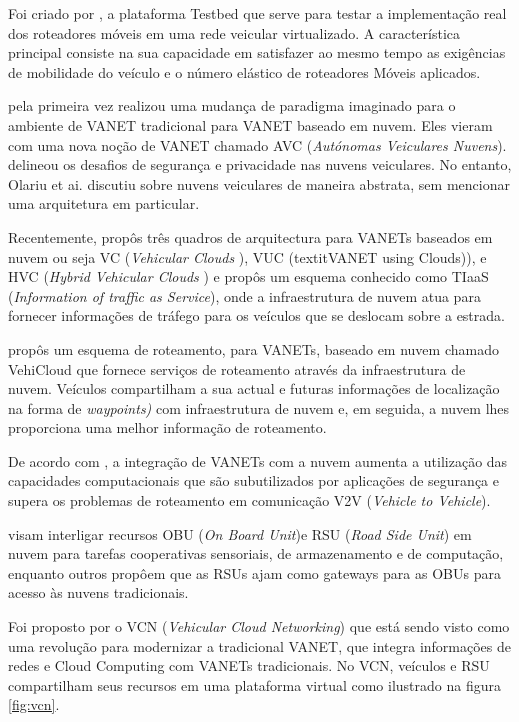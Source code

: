 \documentclass[
	12pt,				%
	oneside,			%
	a4paper,			%
	english,			%
	brazil				%
	]{abntex2ppgsi}
\begin{document}
Foi criado por  , a plataforma Testbed que serve para testar a implementação real dos roteadores móveis em uma rede veicular virtualizado. A característica principal consiste na sua capacidade em satisfazer ao mesmo tempo as exigências de mobilidade do veículo e o número elástico de roteadores Móveis aplicados.

 pela primeira vez realizou uma mudança de paradigma imaginado para o ambiente de VANET tradicional para VANET baseado em nuvem. Eles vieram com uma nova noção de VANET chamado AVC (\textit{Autónomas Veiculares Nuvens}).   delineou os desafios de segurança e privacidade nas nuvens veiculares. No entanto, Olariu et ai. discutiu sobre nuvens veiculares de maneira abstrata, sem mencionar uma arquitetura em  particular. 

Recentemente,  propôs três quadros de arquitectura para VANETs baseados em nuvem ou seja VC (\textit{Vehicular Clouds }), VUC (textit{VANET using Clouds)}), e HVC (\textit{Hybrid Vehicular Clouds }) e propôs um esquema conhecido como TIaaS (\textit{Information of traffic as Service}), onde a infraestrutura de nuvem atua para fornecer informações de tráfego para os veículos que se deslocam sobre a estrada.

  propôs um esquema de roteamento, para VANETs, baseado em nuvem chamado VehiCloud que fornece serviços de roteamento através da infraestrutura de nuvem. Veículos compartilham a sua actual e futuras informações de localização na forma de \textit{waypoints)} com infraestrutura de nuvem e, em seguida, a nuvem lhes proporciona uma melhor informação de roteamento.

De acordo com , a integração de VANETs com a nuvem aumenta a utilização das capacidades computacionais que são subutilizados por aplicações de segurança e supera os problemas de roteamento em comunicação V2V (\textit{Vehicle to Vehicle}).

 visam interligar recursos OBU (\textit{On Board Unit})e RSU (\textit{Road Side Unit}) em nuvem para tarefas cooperativas sensoriais, de armazenamento e de computação, enquanto outros \cite{hussain2012rethinking} \cite{mershad2013finding} propôem que as RSUs ajam como gateways para as OBUs para acesso às nuvens tradicionais.

Foi proposto por  o VCN (\textit{Vehicular Cloud Networking}) que está sendo visto como uma revolução para modernizar a tradicional VANET, que integra informações de redes e Cloud Computing com VANETs tradicionais. No VCN, veículos e  RSU compartilham seus recursos em uma plataforma virtual como ilustrado na figura \ref{fig:vcn}.
\end{document}
